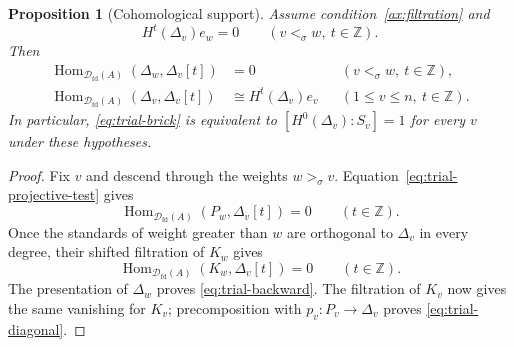 \documentclass[11pt,a4paper]{article}
\newcommand{\D}{\mathcal D}
\newcommand{\ZZ}{\mathbb{Z}}
\newcommand{\std}{\Delta}
\DeclareMathOperator{\fd}{fd}
\DeclareMathOperator{\Hom}{Hom}
\theoremstyle{plain}
\newtheorem{proposition}[theorem]{Proposition}
\theoremstyle{definition}
\numberwithin{equation}{section}
\begin{document}
\begin{proposition}[Cohomological support]
\label{prop:trial-support}
Assume condition~\ref{ax:filtration} and
\begin{equation}\label{eq:trial-support}
 H^t(\std_v)e_w=0\qquad(v<_\sigma w,\ t\in\ZZ).
\end{equation}
Then
\begin{align}
 \Hom_{\D_{\fd}(A)}(\std_w,\std_v[t])&=0
       &&(v<_\sigma w,\ t\in\ZZ),\label{eq:trial-backward}\\
 \Hom_{\D_{\fd}(A)}(\std_v,\std_v[t])&\cong H^t(\std_v)e_v
       &&(1\leq v\leq n,\ t\in\ZZ).
       \label{eq:trial-diagonal}
\end{align}
In particular, \eqref{eq:trial-brick} is equivalent to
$[H^0(\std_v):S_v]=1$ for every $v$ under these hypotheses.
\end{proposition}
\begin{proof}
Fix $v$ and descend through the weights $w>_\sigma v$.
Equation~\eqref{eq:trial-projective-test} gives
\[
 \Hom_{\D_{\fd}(A)}(P_w,\std_v[t])=0\qquad(t\in\ZZ).
\]
Once the standards of weight greater than $w$ are orthogonal to
$\std_v$ in every degree, their shifted filtration of $K_w$ gives
\[
 \Hom_{\D_{\fd}(A)}(K_w,\std_v[t])=0\qquad(t\in\ZZ).
\]
The presentation of $\std_w$ proves \eqref{eq:trial-backward}.
The filtration of $K_v$ now gives the same vanishing for $K_v$;
precomposition with $p_v:P_v\to\std_v$ proves
\eqref{eq:trial-diagonal}.
\end{proof}
\end{document}
